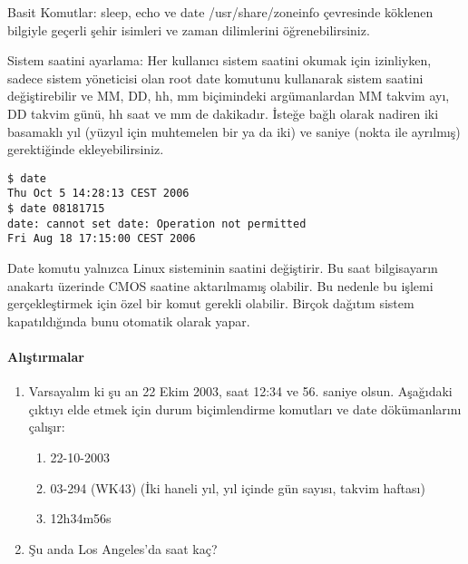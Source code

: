 \begin{section}{Basit Komutlar: sleep, echo ve date}
/usr/share/zoneinfo çevresinde köklenen bilgiyle geçerli şehir isimleri ve zaman dilimlerini öğrenebilirsiniz.

Sistem saatini ayarlama: Her kullanıcı sistem saatini okumak için izinliyken, sadece sistem yöneticisi olan root date komutunu kullanarak sistem saatini değiştirebilir ve MM, DD, hh, mm biçimindeki argümanlardan MM takvim ayı, DD takvim günü, hh saat ve mm de dakikadır. İsteğe bağlı olarak nadiren iki basamaklı yıl (yüzyıl için muhtemelen bir ya da iki) ve saniye (nokta ile ayrılmış) gerektiğinde ekleyebilirsiniz.
\begin{verbatim}
$ date
Thu Oct 5 14:28:13 CEST 2006
$ date 08181715
date: cannot set date: Operation not permitted
Fri Aug 18 17:15:00 CEST 2006
\end{verbatim}

Date komutu yalnızca Linux sisteminin saatini değiştirir. Bu saat bilgisayarın anakartı üzerinde CMOS saatine aktarılmamış olabilir. Bu nedenle bu işlemi gerçekleştirmek için özel bir komut gerekli olabilir. Birçok dağıtım sistem kapatıldığında bunu otomatik olarak yapar.

\paragraph{{\Huge{\PencilLeftDown}}Alıştırmalar}{
\begin{enumerate}
\item Varsayalım ki şu an 22 Ekim 2003, saat 12:34 ve 56. saniye olsun. Aşağıdaki çıktıyı elde etmek için durum biçimlendirme komutları ve date dökümanlarını
çalışır:
\begin{enumerate}
\item 22-10-2003
\item 03-294 (WK43)  (İki haneli yıl, yıl içinde gün sayısı, takvim haftası)
\item 12h34m56s
\end{enumerate}
\item Şu anda Los Angeles’da saat kaç?
\end{enumerate}}
\end{section}
